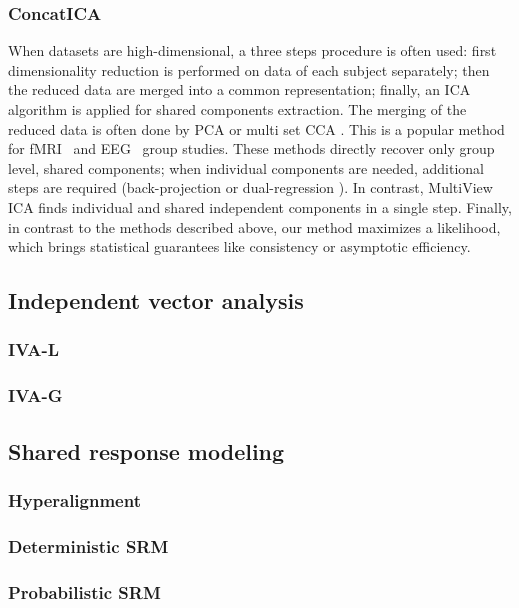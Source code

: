 \documentclass{report}
\begin{document}
\subsubsection{ConcatICA}
When datasets are high-dimensional, a three steps procedure is often used: first dimensionality reduction is performed on data of each subject  separately; then the reduced data are merged into a common representation; finally, an ICA algorithm is applied for shared components extraction. The merging of the reduced data is often done by PCA \cite{calhoun2001method} or multi set CCA \cite{varoquaux2009canica}.
This is a popular method for fMRI~\cite{calhoun2009review} and EEG~\cite{eichele2011eegift} group studies.
These methods directly recover only group level, shared components; when individual components are needed, additional steps are required (back-projection \cite{calhoun2001method} or dual-regression \cite{beckmann2009group}).
%
In contrast, MultiView ICA finds individual and shared independent components in a single step.
%
%
Finally, in contrast to the methods described above, our method maximizes a likelihood, which brings statistical guarantees like consistency or asymptotic efficiency.
\subsection{Independent vector analysis}
\subsubsection{IVA-L}
\subsubsection{IVA-G}
\subsection{Shared response modeling}
\subsubsection{Hyperalignment}
\subsubsection{Deterministic SRM}
\subsubsection{Probabilistic SRM}
\end{document}
